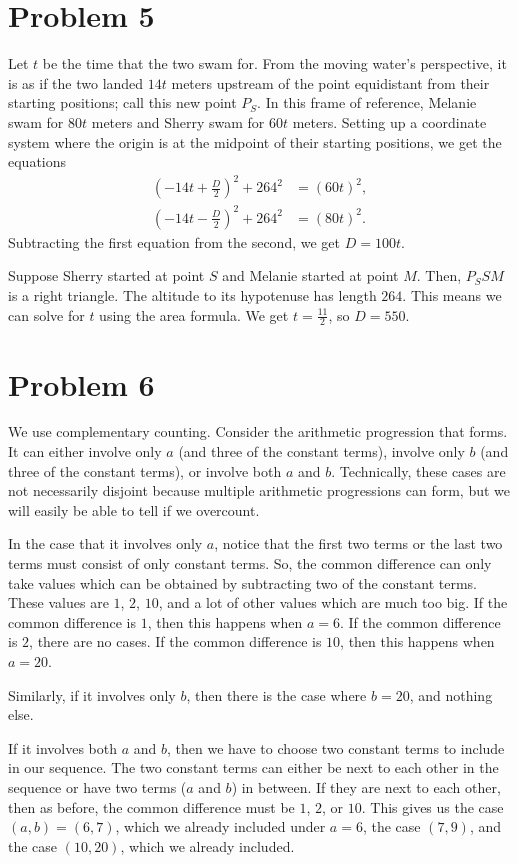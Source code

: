\documentclass{scrartcl}
\begin{document}
\section*{Problem 5}
Let $t$ be the time that the two swam for.
From the moving water's perspective,
it is as if the two landed $14t$ meters upstream of the point
equidistant from their starting positions; call this new point $P_S$.
In this frame of reference,
Melanie swam for $80t$ meters
and Sherry swam for $60t$ meters.
Setting up a coordinate system where the origin is at the midpoint of their starting positions,
we get the equations
\begin{align*}
    \left(-14t + \frac{D}{2}\right)^2 + 264^2 &= (60t)^2, \\
    \left(-14t - \frac{D}{2}\right)^2 + 264^2 &= (80t)^2.
\end{align*}
Subtracting the first equation from the second,
we get $D = 100t$.

Suppose Sherry started at point $S$ and Melanie started at point $M$.
Then, $P_SSM$ is a right triangle. The altitude to its hypotenuse has length $264$.
This means we can solve for $t$ using the area formula.
We get $t = \frac{11}{2}$, so $D = \boxed{550}$.

\section*{Problem 6}
We use complementary counting.
Consider the arithmetic progression that forms.
It can either involve only $a$ (and three of the constant terms),
involve only $b$ (and three of the constant terms),
or involve both $a$ and $b$.
Technically, these cases are not necessarily disjoint because
multiple arithmetic progressions can form,
but we will easily be able to tell if we overcount.

In the case that it involves only $a$, notice that the first two terms
or the last two terms must consist of only constant terms.
So, the common difference can only take values which can be obtained by
subtracting two of the constant terms.
These values are $1$, $2$, $10$, and a lot of other values which are much too big.
If the common difference is $1$, then this happens when $a=6$.
If the common difference is $2$, there are no cases.
If the common difference is $10$, then this happens when $a=20$.

Similarly, if it involves only $b$,
then there is the case where $b=20$, and nothing else.

If it involves both $a$ and $b$, then
we have to choose two constant terms to include in our sequence.
The two constant terms can either be next to each other in the sequence
or have two terms ($a$ and $b$) in between.
If they are next to each other, then as before,
the common difference must be $1$, $2$, or $10$.
This gives us the case $(a,b)=(6,7)$, which we already included under $a=6$,
the case $(7,9)$, and the case $(10,20)$, which we already included.
\end{document}
